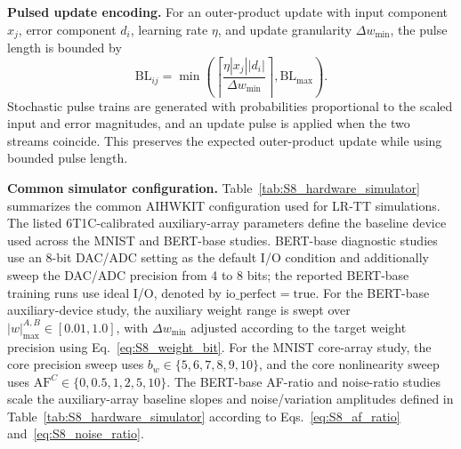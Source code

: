 \documentclass[AMA,LATO1COL]{WileyNJDv5}
\begin{document}
\noindent\textbf{Pulsed update encoding.}
For an outer-product update with input component \(x_j\), error component \(d_i\), learning rate \(\eta\), and update granularity \(\Delta w_{\min}\), the pulse length is bounded by
\begin{equation}
\mathrm{BL}_{ij}
=
\min
\left(
\left\lceil
\frac{\eta |x_j||d_i|}{\Delta w_{\min}}
\right\rceil,
\mathrm{BL}_{\max}
\right).
\label{eq:S8_bl}
\end{equation}
Stochastic pulse trains are generated with probabilities proportional to the scaled input and error magnitudes, and an update pulse is applied when the two streams coincide. This preserves the expected outer-product update while using bounded pulse length.

\noindent\textbf{Common simulator configuration.}
Table~\ref{tab:S8_hardware_simulator} summarizes the common AIHWKIT configuration used for LR-TT simulations. The listed 6T1C-calibrated auxiliary-array parameters define the baseline device used across the MNIST and BERT-base studies. BERT-base diagnostic studies use an 8-bit DAC/ADC setting as the default I/O condition and additionally sweep the DAC/ADC precision from 4 to 8 bits; the reported BERT-base training runs use ideal I/O, denoted by \(\mathrm{io\_perfect}=\mathrm{true}\). For the BERT-base auxiliary-device study, the auxiliary weight range is swept over \(|w|_{\max}^{A,B}\in[0.01,1.0]\), with \(\Delta w_{\min}\) adjusted according to the target weight precision using Eq.~\eqref{eq:S8_weight_bit}. For the MNIST core-array study, the core precision sweep uses \(b_w\in\{5,6,7,8,9,10\}\), and the core nonlinearity sweep uses \(\mathrm{AF}^{C}\in\{0,0.5,1,2,5,10\}\). The BERT-base AF-ratio and noise-ratio studies scale the auxiliary-array baseline slopes and noise/variation amplitudes defined in Table~\ref{tab:S8_hardware_simulator} according to Eqs.~\eqref{eq:S8_af_ratio} and~\eqref{eq:S8_noise_ratio}.
\end{document}
